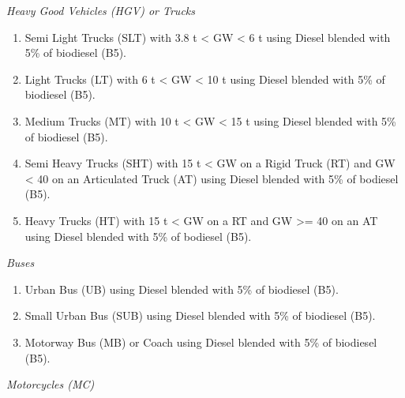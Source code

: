 \documentclass[12pt,graybox,envcountchap,sectrefs]{krantz}
\providecommand{\tightlist}{%
  \setlength{\itemsep}{0pt}\setlength{\parskip}{0pt}}
\theoremstyle{definition}
\theoremstyle{definition}
\theoremstyle{definition}
\theoremstyle{remark}
\begin{document}
\emph{Heavy Good Vehicles (HGV) or Trucks}

\begin{enumerate}
\def\labelenumi{\arabic{enumi}.}
\tightlist
\item
  Semi Light Trucks (SLT) with 3.8 t \textless{} GW \textless{} 6 t
  using Diesel blended with 5\% of biodiesel (B5).
\item
  Light Trucks (LT) with 6 t \textless{} GW \textless{} 10 t using
  Diesel blended with 5\% of biodiesel (B5).
\item
  Medium Trucks (MT) with 10 t \textless{} GW \textless{} 15 t using
  Diesel blended with 5\% of biodiesel (B5).
\item
  Semi Heavy Trucks (SHT) with 15 t \textless{} GW on a Rigid Truck (RT)
  and GW \textless{} 40 on an Articulated Truck (AT) using Diesel
  blended with 5\% of bodiesel (B5).
\item
  Heavy Trucks (HT) with 15 t \textless{} GW on a RT and GW
  \textgreater{}= 40 on an AT using Diesel blended with 5\% of bodiesel
  (B5).
\end{enumerate}

\emph{Buses}

\begin{enumerate}
\def\labelenumi{\arabic{enumi}.}
\tightlist
\item
  Urban Bus (UB) using Diesel blended with 5\% of biodiesel (B5).
\item
  Small Urban Bus (SUB) using Diesel blended with 5\% of biodiesel (B5).
\item
  Motorway Bus (MB) or Coach using Diesel blended with 5\% of biodiesel
  (B5).
\end{enumerate}

\emph{Motorcycles (MC)}
\end{document}
